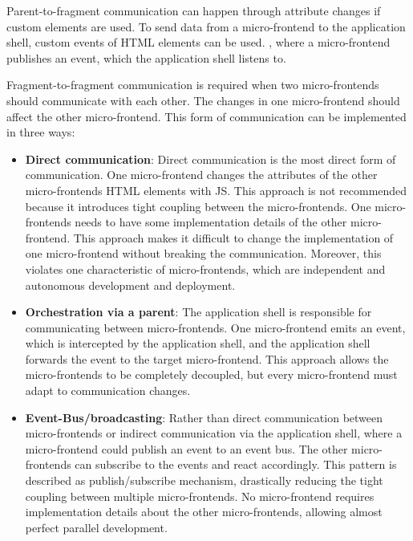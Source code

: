 \noindent Parent-to-fragment communication can happen through attribute changes if custom elements are used. \cite[58-59]{book:2019:farrell:background:micro-frontends:web-components-in-action} To send data from a micro-frontend to the application shell, custom events of \ac{HTML} elements can be used. \cite[315]{book:2019:farrell:background:micro-frontends:web-components-in-action}, where a micro-frontend publishes an event, which the application shell listens to. \cite{book:2020:geers:background:micro-frontends:micro-frontends-in-action}

\bigskip

\noindent Fragment-to-fragment communication is required when two micro-frontends should communicate with each other. The changes in one micro-frontend should affect the other micro-frontend. This form of communication can be implemented in three ways: \cite[107-108]{book:2020:geers:background:micro-frontends:micro-frontends-in-action}

\begin{itemize}
  \item \textbf{Direct communication}: Direct communication is the most direct form of communication. One micro-frontend changes the attributes of the other micro-frontends \ac{HTML} elements with \ac{JS}. This approach is not recommended because it introduces tight coupling between the micro-frontends. One micro-frontends needs to have some implementation details of the other micro-frontend. This approach makes it difficult to change the implementation of one micro-frontend without breaking the communication. Moreover, this violates one characteristic of micro-frontends, which are independent and autonomous development and deployment.
  \item \textbf{Orchestration via a parent}: The application shell is responsible for communicating between micro-frontends. One micro-frontend emits an event, which is intercepted by the application shell, and the application shell forwards the event to the target micro-frontend. This approach allows the micro-frontends to be completely decoupled, but every micro-frontend must adapt to communication changes.
  \item \textbf{Event-Bus/broadcasting}: Rather than direct communication between micro-frontends or indirect communication via the application shell, where a micro-frontend could publish an event to an event bus. The other micro-frontends can subscribe to the events and react accordingly. This pattern is described as publish/subscribe mechanism, drastically reducing the tight coupling between multiple micro-frontends. No micro-frontend requires implementation details about the other micro-frontends, allowing almost perfect parallel development.
\end{itemize}
